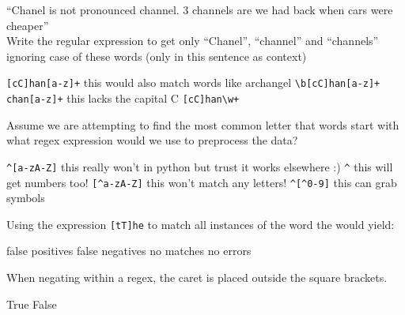 \documentclass[theme=sleek, randomorder, hidesidemenu]{webquiz}
\begin{document}
\begin{question}
  ``Chanel is not pronounced channel. 3 channels are we had back when cars were cheaper''\\
  Write the regular expression to get only ``Chanel'', ``channel'' and ``channels'' ignoring case of these words (only in this sentence as context)

  \begin{choice}[columns=2]
    \incorrect \verb|[cC]han[a-z]+|
    \feedback this would also match words like archangel
    \correct \verb|\b[cC]han[a-z]+|
    \incorrect \verb|chan[a-z]+| \feedback this lacks the capital C
    \incorrect \verb|[cC]han\w+|

  \end{choice}


\end{question}
\begin{question}
  Assume we are attempting to find the most common letter that words start with what regex expression would we use to preprocess the data?
  \begin{choice}[columns=2]
    \correct \verb|^[a-zA-Z]| \feedback this really won't in python but trust it works elsewhere :)
    \incorrect \verb|^| \feedback this will get numbers too!
    \incorrect \verb|[^a-zA-Z]| \feedback this won't match any letters!
    \incorrect \verb|^[^0-9]| \feedback this can grab symbols
  \end{choice}

\end{question}

\begin{question}
  Using the expression \verb|[tT]he| to match all instances of the word the would yield:
  \begin{choice}[columns=2]
    \correct false positives
    \incorrect false negatives
    \incorrect no matches
    \incorrect no errors

  \end{choice}

\end{question}

\begin{question}

  When negating within a regex, the caret is placed outside the square brackets.

  \begin{choice}
    \incorrect True
    \correct False
  \end{choice}

\end{question}
\end{document}
